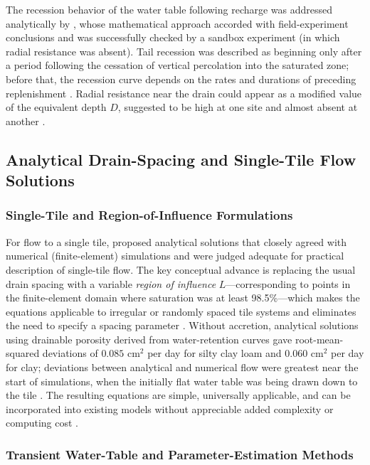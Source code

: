 The recession behavior of the water table following recharge was addressed analytically
by \textcite{VANDELEUR1959}, whose mathematical approach accorded with field-experiment
conclusions and was successfully checked by a sandbox experiment (in which radial
resistance was absent). Tail recession was described as beginning only after a period
following the cessation of vertical percolation into the saturated zone; before that, the
recession curve depends on the rates and durations of preceding replenishment
\parencite{VANDELEUR1959}. Radial resistance near the drain could appear as a modified
value of the equivalent depth $D$, suggested to be high at one site and almost absent at
another \parencite{VANDELEUR1959}.

\subsection{Analytical Drain-Spacing and Single-Tile Flow Solutions}

\subsubsection{Single-Tile and Region-of-Influence Formulations}

For flow to a single tile, \textcite{Cooke2001} proposed analytical solutions that closely
agreed with numerical (finite-element) simulations and were judged adequate for practical
description of single-tile flow. The key conceptual advance is replacing the usual drain
spacing with a variable \emph{region of influence} $L$---corresponding to points in the
finite-element domain where saturation was at least 98.5\%---which makes the equations
applicable to irregular or randomly spaced tile systems and eliminates the need to specify
a spacing parameter \parencite{Cooke2001}. Without accretion, analytical solutions using
drainable porosity derived from water-retention curves gave root-mean-squared deviations
of $0.085$ cm$^2$ per day for silty clay loam and $0.060$ cm$^2$ per day for clay;
deviations between analytical and numerical flow were greatest near the start of
simulations, when the initially flat water table was being drawn down to the tile
\parencite{Cooke2001}. The resulting equations are simple, universally applicable, and can
be incorporated into existing models without appreciable added complexity or computing
cost \parencite{Cooke2001}.

\subsubsection{Transient Water-Table and Parameter-Estimation Methods}

